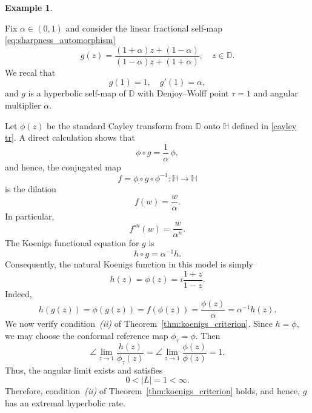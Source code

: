 \documentclass[12pt]{amsart}
\numberwithin{equation}{section}
\theoremstyle{plain}
\theoremstyle{definition}
\newtheorem{example}[equation]{Example}
\begin{document}
\begin{example}
\label{ex:lft_koenigs}

Fix $\alpha\in(0,1)$ and consider the linear fractional self-map \eqref{eq:sharpness_automorphism}
\begin{equation*}
g(z)
=
\frac{(1+\alpha)z+(1-\alpha)}
     {(1-\alpha)z+(1+\alpha)},
\quad z\in\mathbb{D}.
\end{equation*}
We recal that
\begin{equation*}
g(1)=1,
\quad
g'(1)=\alpha,
\end{equation*}
and $g$ is a hyperbolic self-map of $\mathbb{D}$ with Denjoy--Wolff
point $\tau=1$ and angular multiplier $\alpha$.

Let $\phi(z)$
be the standard Cayley transform from $\mathbb{D}$ onto $\mathbb{H}$ defined in \eqref{cayley tr}.
A direct calculation shows that
\begin{equation*}
\phi\circ g=\frac1\alpha\,\phi,
\end{equation*}
and hence, the conjugated map
\begin{equation*}
f=\phi\circ g\circ\phi^{-1}:\mathbb{H}\to\mathbb{H}
\end{equation*}
is the dilation
\begin{equation*}
f(w)=\frac{w}{\alpha}.
\end{equation*}
In particular,
\begin{equation*}
f^{\circ n}(w)=\frac{w}{\alpha^n}.
\end{equation*}
The Koenigs functional equation for $g$ is
\begin{equation*}
h\circ g=\alpha^{-1}h.
\end{equation*}
Consequently, the natural Koenigs function in this model is simply
\begin{equation*}
h(z)=\phi(z)=i\frac{1+z}{1-z}.
\end{equation*}
Indeed,
\begin{equation*}
h(g(z))
=
\phi(g(z))
=
f(\phi(z))
=
\frac{\phi(z)}{\alpha}
=
\alpha^{-1}h(z).
\end{equation*}
We now verify condition~\emph{(ii)} of
Theorem~\ref{thm:koenigs_criterion}. Since $h=\phi$, we may choose
the conformal reference map $\phi_\tau=\phi.$ Then
\begin{equation*}
\angle\lim_{z\to1}
\frac{h(z)}{\phi_\tau(z)}
=
\angle\lim_{z\to1}
\frac{\phi(z)}{\phi(z)}
=
1.
\end{equation*}
Thus, the angular limit exists and satisfies
\begin{equation*}
0<|L|=1<\infty.
\end{equation*}
Therefore, condition~\emph{(ii)} of
Theorem~\ref{thm:koenigs_criterion} holds, and hence, $g$ has an
extremal hyperbolic rate.


\end{example}
\end{document}
